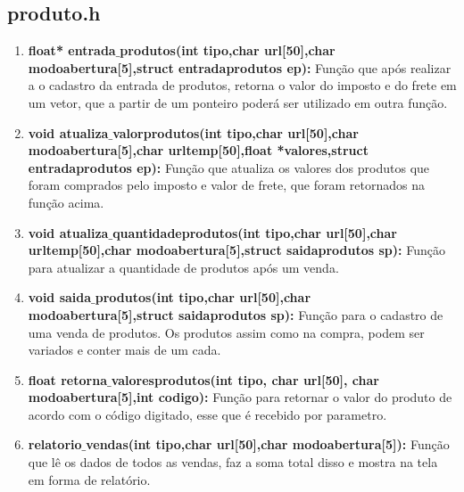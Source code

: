 \documentclass{article}
\begin{document}
\subsection{produto.h}
\begin{enumerate}
	\item \textbf{float* entrada$\_$produtos(int tipo,char url[50],char modoabertura[5],struct entradaprodutos ep): }Função que após realizar a o cadastro da entrada de produtos, retorna o valor do imposto e do frete em um vetor, que a partir de um ponteiro poderá ser utilizado em outra função.\\
	\item \textbf{void atualiza$\_$valorprodutos(int tipo,char url[50],char modoabertura[5],char urltemp[50],float *valores,struct entradaprodutos ep): }Função que atualiza os valores dos produtos que foram comprados pelo imposto e valor de frete, que foram retornados na função acima.\\
	\item \textbf{void atualiza$\_$quantidadeprodutos(int tipo,char url[50],char urltemp[50],char modoabertura[5],struct saidaprodutos sp): }Função para atualizar a quantidade de produtos após um venda.\\
	\item \textbf{void saida$\_$produtos(int tipo,char url[50],char modoabertura[5],struct saidaprodutos sp): }Função para o cadastro de uma venda de produtos. Os produtos assim como na compra, podem ser variados e conter mais de um cada.\\
	\item \textbf{float retorna$\_$valoresprodutos(int tipo, char url[50], char modoabertura[5],int codigo): }Função para retornar o valor do produto de acordo com o código digitado, esse que é recebido por parametro.\\
	\item \textbf{relatorio$\_$vendas(int tipo,char url[50],char modoabertura[5]): }Função que lê os dados de todos as vendas, faz a soma total disso e mostra na tela em forma de relatório.\\
\end{enumerate}
\end{document}
